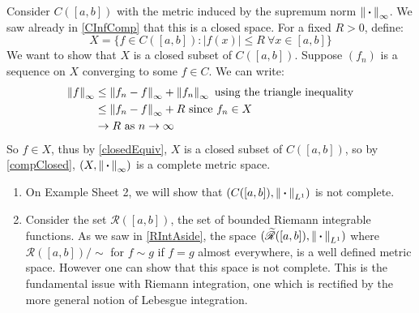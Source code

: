 \documentclass[../main.tex]{subfiles}
\begin{document}
\begin{example}
  Consider $C([a, b])$ with the metric induced by the supremum norm $\left\lVert {\hspace{0.18em}\boldsymbol{\cdot}\hspace{0.18em}} \right\rVert_{\infty}$.
  We saw already in \cref{CInfComp} that this is a closed space.
  For a fixed $R > 0$, define:
  \[
    X = \{f \in C([a, b]): |f(x)| \leq R\ \forall x \in [a, b]\}
  \]
  We want to show that $X$ is a closed subset of $C([a, b])$.
  Suppose $(f_n)$ is a sequence on $X$ converging to some $f \in C$.
  We can write:
  \begin{align*}
    \left\lVert f \right\rVert_{\infty} &\leq \left\lVert f_n - f \right\rVert_{\infty} + \left\lVert f_n \right\rVert_{\infty} \text{ using the triangle inequality} \\
                      &\leq \left\lVert f_n - f \right\rVert_{\infty} + R \text{ since } f_n \in X \\
                      &\to R \text{ as } n \to \infty
  \end{align*}
  So $f \in X$, thus by \cref{closedEquiv}, $X$ is a closed subset of $C([a, b])$, so by \cref{compClosed}, $(X, \left\lVert {\hspace{0.18em}\boldsymbol{\cdot}\hspace{0.18em}} \right\rVert_{\infty})$ is a complete metric space.
\end{example}
\begin{example}
  \begin{enumerate}
    \item On Example Sheet 2, we will show that $(C([a, b]), \left\lVert {\hspace{0.18em}\boldsymbol{\cdot}\hspace{0.18em}} \right\rVert_{L^1})$ is not complete.
    \item Consider the set $\mathscr{R}([a, b])$, the set of bounded Riemann integrable functions.
      As we saw in \cref{RIntAside}, the space $(\widetilde{\mathscr{R}}([a, b]), \left\lVert {\hspace{0.18em}\boldsymbol{\cdot}\hspace{0.18em}} \right\rVert_{L^1})$ where $\mathscr{R}([a, b]) / \sim$ for $f \sim g$ if $f = g$ almost everywhere, is a well defined metric space.
      However one can show that this space is not complete.
      This is the fundamental issue with Riemann integration, one which is rectified by the more general notion of Lebesgue integration.
  \end{enumerate}
\end{example}
\end{document}
